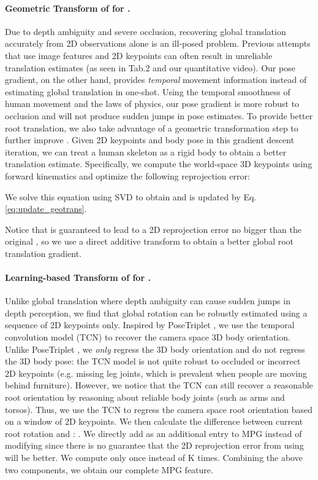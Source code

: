 \paragraph{Geometric Transform of  for .} Due to depth ambiguity and severe occlusion, recovering global translation accurately from 2D observations alone is an ill-posed problem. Previous attempts that use image features\cite{Moon2019CameraDT} and 2D keypoints \cite{Pavllo20193DHP} can often result in unreliable translation estimates (as seen in Tab.2 and our quantitative video). Our pose gradient, on the other hand, provides \textit{temporal} movement information instead of estimating global translation in one-shot. Using the temporal smoothness of human movement and the laws of physics, our pose gradient is more robust to occlusion and will not produce sudden jumps in pose estimates. To provide better root translation, we also take advantage of a geometric transformation step to further improve . Given 2D keypoints  and body pose  in this gradient descent iteration, we can treat a human skeleton as a rigid body to obtain a better translation estimate. Specifically, we compute the world-space 3D keypoints using forward kinematics  and optimize the following reprojection error:

We solve this equation using SVD to obtain  and  is updated by Eq. \ref{eq:update_geotrans}.

Notice that  is guaranteed to lead to a 2D reprojection error no bigger than the original , so we use a direct additive transform to obtain a better global root translation gradient. 

\paragraph{Learning-based Transform of  for .}
Unlike global translation where depth ambiguity can cause sudden jumps in depth perception, we find that global rotation can be robustly estimated using a sequence of 2D keypoints only. Inspired by PoseTriplet \cite{Gong2022PoseTripletC3}, we use the temporal convolution model (TCN) \cite{Pavllo20193DHP} to recover the camera space 3D body orientation. Unlike PoseTriplet \cite{Gong2022PoseTripletC3}, we \textit{only} regress the 3D body orientation and do not regress the 3D body pose: the TCN model is not quite robust to occluded or incorrect 2D keypoints (e.g. missing leg joints, which is prevalent when people are moving behind furniture). However, we notice that the TCN can still recover a reasonable root orientation by reasoning about reliable body joints (such as arms and torsos). Thus, we use the TCN to regress the camera space root orientation  based on a window of 2D keypoints. We then calculate the difference between current root rotation  and : . We directly add  as an additional entry to MPG instead of modifying  since there is no guarantee that the 2D reprojection error from using  will be better. We compute  only once instead of K times. Combining the above two components, we obtain our complete MPG feature. 







